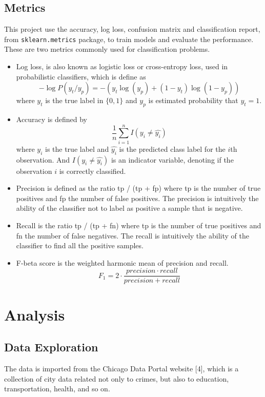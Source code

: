 \documentclass[12pt]{article}
\begin{document}
\subsection{Metrics} 
This project use the accuracy, log loss, confusion matrix and classification report, from \verb|sklearn.metrics| package, to train models and evaluate the performance. These are two metrics commonly used for classification problems.
\begin{itemize}
\item Log loss, is also known as logistic loss or cross-entropy loss, used in probabilistic classifiers, which is define as 
\begin{equation}
-\log P(y_t/y_p) = -(y_t\log (y_p) + (1-y_t)\log (1-y_p))
\end{equation}
where $y_t$ is the true label in $\{0, 1\}$ and $y_p$ is estimated probability that $y_t = 1$.
\item Accuracy is defined by
\begin{equation}
\frac{1}{n}\sum_{i=1}^n I(y_i \neq \hat{y_i})
\end{equation}
where $y_i$ is the true label and $\hat{y_i}$ is the predicted class label for the $i$th observation. And $I(y_i \neq \hat{y_i})$ is an indicator variable, denoting if the observation $i$ is correctly classified.
\item Precision is defined as the ratio tp / (tp + fp) where tp is the number of true positives and fp the number of false positives. The precision is intuitively the ability of the classifier not to label as positive a sample that is negative.
\item Recall is the ratio tp / (tp + fn) where tp is the number of true positives and fn the number of false negatives. The recall is intuitively the ability of the classifier to find all the positive samples.
\item F-beta score is the weighted harmonic mean of precision and recall.
\begin{equation}
F_1 =2 \cdot \frac{precision \cdot recall}{ precision + recall}
\end{equation}
\end{itemize}



\section{Analysis}
\subsection{Data Exploration}
The data is imported from the Chicago Data Portal website [4], which is a collection of city data related not only to crimes, but also to education, transportation, health, and so on.
\end{document}
